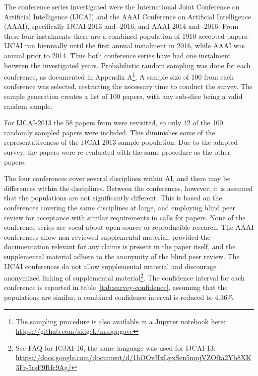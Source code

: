 The conference series investigated were the International Joint Conference on Artificial Intelligence (IJCAI) and the AAAI Conference on Artificial Intelligence (AAAI), specifically IJCAI-2013 and -2016, and AAAI-2014 and -2016. From these four instalments there are a combined population of 1910 accepted papers. IJCAI ran biennially until the first annual instalment in 2016, while AAAI was annual prior to 2014. Thus both conference series have had one instalment between the investigated years. Probabilistic random sampling was done for each conference, as documented in Appendix A\footnote{The sampling procedure is also available in a Jupyter notebook here: \url{https://github.com/sidgek/msoppgave}}. A sample size of 100 from each conference was selected, restricting the necessary time to conduct the survey. The sample generation creates a list of 100 papers, with any sub-slice being a valid random sample.

For IJCAI-2013 the 58 papers from \cite{Gundersen2015} were revisited, so only 42 of the 100 randomly sampled papers were included. This diminishes some of the representativeness of the IJCAI-2013 sample population. Due to the adapted survey, the papers were re-evaluated with the same procedure as the other papers.

The four conferences cover several disciplines within AI, and there may be differences within the disciplines. Between the conferences, however, it is assumed that the populations are not significantly different. This is based on the conferences covering the same disciplines at large, and employing blind peer review for acceptance with similar requirements in calls for papers. None of the conference series are vocal about open source or reproducible research. The AAAI conferences allow non-reviewed supplemental material, provided the documentation relevant for any claims is present in the paper itself, and the supplemental material adhere to the anonymity of the blind peer review. The IJCAI conferences do not allow supplemental material and discourage anonymized linking of supplemental material\footnote{See FAQ for ICJAI-16, the same language was used for IJCAI-13: \url{https://docs.google.com/document/d/1hOOvHxLyxSen5mnjVZOfta2Yb8XK3Fr-5rsF9Rfc9Ag/}}. The confidence interval for each conference is reported in table~\ref{tab:survey-confidence}, assuming that the populations are similar, a combined confidence interval is reduced to 4.36\%.

